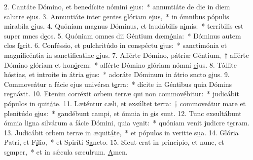 2. Cantáte Dómino, et benedícite nómini \uline{e}jus:~* annuntiáte de die in diem salutre \uline{e}jus.
3. Annuntiáte inter gentes glóriam \uline{e}jus,~* in ómnibus pópulis mirabíla \uline{e}jus.
4. Quóniam magnus Dóminus, et laudábilis n\uline{i}mis:~* terríbilis est super mnes d\uline{e}os.
5. Quóniam omnes dii Géntium dæm\uline{ó}nia:~* Dóminus autem clos f\uline{e}cit.
6. Conféssio, et pulchritúdo in conspéctu \uline{e}jus:~* sanctimónia et magnificéntia in sanctificatine \uline{e}jus.
7. Afférte Dómino, pátriæ Géntium,~† afférte Dómino glóriam et hon\uline{ó}rem:~* afférte Dómino glóriam nómni \uline{e}jus.
8. Tóllite hóstias, et introíte in átria \uline{e}jus:~* adoráte Dóminum in átrio sncto \uline{e}jus.
9. Commoveátur a fácie ejus univérsa t\uline{e}rra:~* dícite in Géntibus quia Dómins regn\uline{á}vit.
10. Etenim corréxit orbem terræ qui non commov\uline{é}bitur:~* judicábit pópulos in quit\uline{á}te.
11. Læténtur cæli, et exsúltet terra:~† commoveátur mare et plenitúdo \uline{e}jus:~* gaudébunt campi, et ómnia  in \uline{e}is sunt.
12. Tunc exsultábunt ómnia ligna silvárum a fácie Dómini, quia v\uline{e}nit:~* quóniam venit judicre t\uline{e}rram.
13. Judicábit orbem terræ in æquit\uline{á}te,~* et pópulos in veritte s\uline{u}a.
14. Glória Patri, et F\uline{í}lio,~* et Spiríti S\uline{a}ncto.
15. Sicut erat in princípio, et nunc, et s\uline{e}mper,~* et in sǽcula sæculrum. \uline{A}men.
